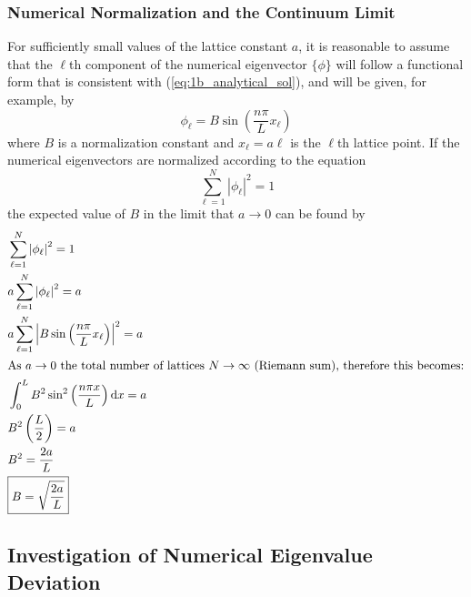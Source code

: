\documentclass[a4paper, 10pt]{article}
\begin{document}
\subsubsection{Numerical Normalization and the Continuum Limit}
\noindent For sufficiently small values of the lattice constant $a$, it is reasonable to assume that the $\ell$th component of the numerical eigenvector $\{\phi\}$ will follow a functional form that is consistent with (\ref{eq:1b_analytical_sol}), and will be given, for example, by
\begin{equation}
    \phi_{\ell} = B \sin \left( \frac{n \pi}{L} x_{\ell} \right)
\end{equation}
where $B$ is a normalization constant and $x_{\ell} = a\ell$ is the $\ell$th lattice point. If the numerical eigenvectors are normalized according to the equation
\begin{equation}
    \sum_{\ell=1}^{N} |\phi_{\ell}|^2 = 1
\end{equation}
the expected value of $B$ in the limit that $a \to 0$ can be found by
\begin{align*}
    &\sum^N_{\ell=1} \left| \phi_{\ell} \right|^2 = 1 \\
    &a\sum^N_{\ell=1} \left| \phi_{\ell} \right|^2 = a \\
    &a\sum^N_{\ell=1} \left| B \sin \left( \frac{n \pi}{L} x_\ell \right) \right|^2 = a \\
    \intertext{As $a \rightarrow 0$ the total number of lattices $N \rightarrow \infty$ (Riemann sum), therefore this becomes:}
    &\int_0^L B^2 \sin^2\left(\frac{n\pi x}{L}\right) \dd{x} = a \\
    &B^2 \left( \frac{L}{2} \right) = a \\
    &B^2 = \frac{2a}{L} \\
    &\boxed{B = \sqrt{\frac{2a}{L}}}
\end{align*}

\subsection{Investigation of Numerical Eigenvalue Deviation}

\end{document}
